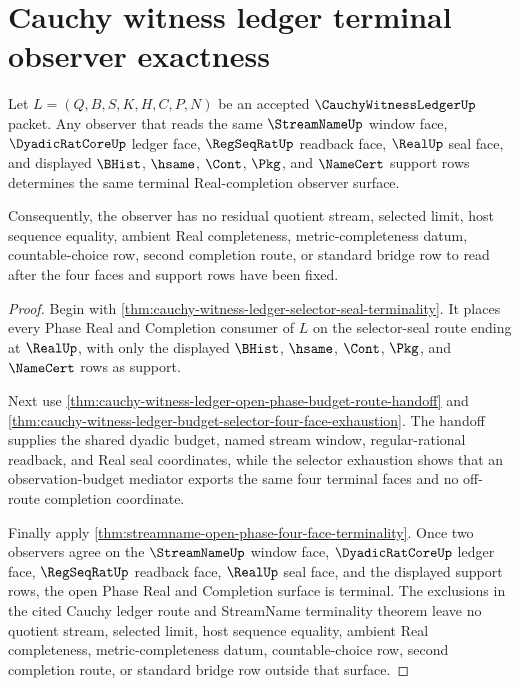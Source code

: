 \section{Cauchy witness ledger terminal observer exactness}
\label{sec:cauchy-witness-ledger-terminal-observer-exactness}

\begin{theorem}
\label{thm:cauchy-witness-ledger-terminal-observer-exactness}
Let $L=(Q,B,S,K,H,C,P,N)$ be an accepted $\CauchyWitnessLedgerUp$ packet. Any observer that reads the same $\StreamNameUp$ window face, $\DyadicRatCoreUp$ ledger face, $\RegSeqRatUp$ readback face, $\RealUp$ seal face, and displayed $\BHist$, $\hsame$, $\Cont$, $\Pkg$, and $\NameCert$ support rows determines the same terminal Real-completion observer surface.

Consequently, the observer has no residual quotient stream, selected limit, host sequence equality, ambient Real completeness, metric-completeness datum, countable-choice row, second completion route, or standard bridge row to read after the four faces and support rows have been fixed.
\end{theorem}
\begin{proof}
Begin with \autoref{thm:cauchy-witness-ledger-selector-seal-terminality}. It places every Phase Real and Completion consumer of $L$ on the selector-seal route ending at $\RealUp$, with only the displayed $\BHist$, $\hsame$, $\Cont$, $\Pkg$, and $\NameCert$ rows as support.

Next use \autoref{thm:cauchy-witness-ledger-open-phase-budget-route-handoff} and \autoref{thm:cauchy-witness-ledger-budget-selector-four-face-exhaustion}. The handoff supplies the shared dyadic budget, named stream window, regular-rational readback, and Real seal coordinates, while the selector exhaustion shows that an observation-budget mediator exports the same four terminal faces and no off-route completion coordinate.

Finally apply \autoref{thm:streamname-open-phase-four-face-terminality}. Once two observers agree on the $\StreamNameUp$ window face, $\DyadicRatCoreUp$ ledger face, $\RegSeqRatUp$ readback face, $\RealUp$ seal face, and the displayed support rows, the open Phase Real and Completion surface is terminal. The exclusions in the cited Cauchy ledger route and StreamName terminality theorem leave no quotient stream, selected limit, host sequence equality, ambient Real completeness, metric-completeness datum, countable-choice row, second completion route, or standard bridge row outside that surface.
\end{proof}

